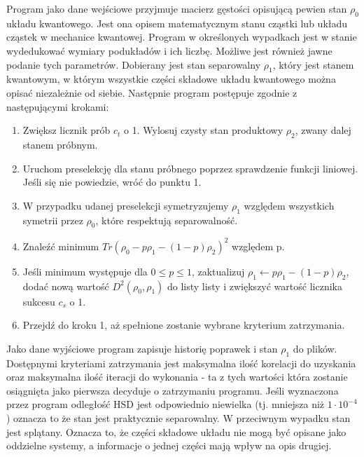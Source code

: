 \documentclass[11pt, a4paper]{article}
\begin{document}
\begin{sloppypar}
    Program jako dane wejściowe przyjmuje macierz gęstości opisującą pewien stan $\rho_{0}$
    układu kwantowego. Jest ona opisem matematycznym stanu cząstki lub układu cząstek w
    mechanice kwantowej. Program w określonych wypadkach jest w stanie wydedukować wymiary
    podukładów i ich liczbę. Możliwe jest również jawne podanie tych parametrów. Dobierany
    jest stan separowalny $\rho_{1}$, który jest stanem kwantowym, w którym wszystkie części
    składowe układu kwantowego można opisać niezależnie od siebie. Następnie program
    postępuje zgodnie z następującymi krokami:

    \begin{enumerate}
      \item Zwiększ licznik prób $c_{t}$ o 1. Wylosuj czysty stan produktowy $\rho_{2}$,
        zwany dalej stanem próbnym.

      \item Uruchom preselekcję dla stanu próbnego poprzez sprawdzenie funkcji liniowej.
        Jeśli się nie powiedzie, wróć do punktu 1.

      \item W przypadku udanej preselekcji symetryzujemy $\rho_{1}$ względem wszystkich symetrii
        przez $\rho_{0}$, które respektują separowalność.

      \item Znaleźć minimum $Tr(\rho_{0}- p\rho_{1}- (1 - p)\rho_{2})^{2}$ względem p.

      \item Jeśli minimum występuje dla $0 \le p \le 1$, zaktualizuj
        $\rho_{1}\leftarrow p\rho_{1}- (1 - p)\rho_{2}$, dodać nową wartość $D^{2}(\rho_{0}
        , \rho_{1})$ do listy listy i zwiększyć wartość licznika sukcesu $c_{s}$ o 1.

      \item Przejdź do kroku 1, aż spełnione zostanie wybrane kryterium zatrzymania.
    \end{enumerate}

    Jako dane wyjściowe program zapisuje historię poprawek i stan $\rho_{1}$ do plików.
    Dostępnymi kryteriami zatrzymania jest maksymalna ilość korelacji do uzyskania oraz
    maksymalna ilość iteracji do wykonania - ta z tych wartości która zostanie
    osiągnięta jako pierwsza decyduje o zatrzymaniu programu. Jeśli wyznaczona przez program
    odległość HSD jest odpowiednio niewielka (tj. mniejsza niż $1 \cdot 10^{-4}$)
    oznacza to że stan jest praktycznie separowalny. W przeciwnym wypadku stan jest splątany.
    Oznacza to, że części składowe układu nie mogą być opisane jako oddzielne systemy, a
    informacje o jednej części mają wpływ na opis drugiej.


\end{sloppypar}
\end{document}
